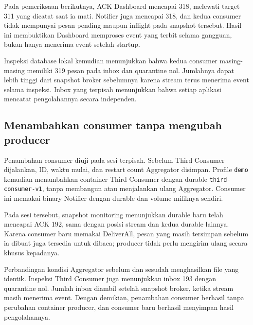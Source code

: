 Pada pemeriksaan berikutnya, ACK Dashboard mencapai 318, melewati target 311 yang dicatat saat ia mati. Notifier juga mencapai 318, dan kedua consumer tidak mempunyai pesan pending maupun inflight pada snapshot tersebut. Hasil ini membuktikan Dashboard memproses event yang terbit selama gangguan, bukan hanya menerima event setelah startup.

Inspeksi database lokal kemudian menunjukkan bahwa kedua consumer masing-masing memiliki 319 pesan pada inbox dan quarantine nol. Jumlahnya dapat lebih tinggi dari snapshot broker sebelumnya karena stream terus menerima event selama inspeksi. Inbox yang terpisah menunjukkan bahwa setiap aplikasi mencatat pengolahannya secara independen.

\subsection{Menambahkan consumer tanpa mengubah producer}
Penambahan consumer diuji pada sesi terpisah. Sebelum Third Consumer dijalankan, ID, waktu mulai, dan restart count Aggregator disimpan. Profile \texttt{demo} kemudian menambahkan container Third Consumer dengan durable \texttt{third-consumer-v1}, tanpa membangun atau menjalankan ulang Aggregator. Consumer ini memakai binary Notifier dengan durable dan volume miliknya sendiri.

Pada sesi tersebut, snapshot monitoring menunjukkan durable baru telah mencapai ACK 192, sama dengan posisi stream dan kedua durable lainnya. Karena consumer baru memakai DeliverAll, pesan yang masih tersimpan sebelum ia dibuat juga tersedia untuk dibaca; producer tidak perlu mengirim ulang secara khusus kepadanya.

Perbandingan kondisi Aggregator sebelum dan sesudah menghasilkan file yang identik. Inspeksi Third Consumer juga menunjukkan inbox 193 dengan quarantine nol. Jumlah inbox diambil setelah snapshot broker, ketika stream masih menerima event. Dengan demikian, penambahan consumer berhasil tanpa perubahan container producer, dan consumer baru berhasil menyimpan hasil pengolahannya.

